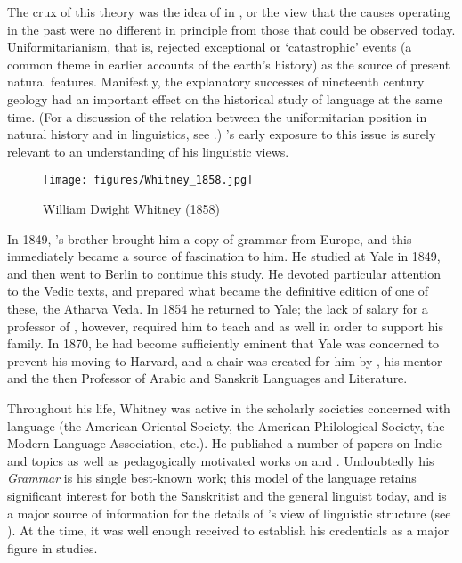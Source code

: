 The crux of this theory was the idea of \emph{} in
, or the view that the causes operating in the past
were no different in principle from those that could be observed
today. Uniformitarianism, that is, rejected exceptional or
`catastrophic' events (a common theme in earlier accounts of the
earth's history) as the source of present natural
features. Manifestly, the explanatory successes of nineteenth century
geology had an important effect on the historical study of language at
the same time. (For a discussion of the relation between the
uniformitarian position in natural history and in linguistics, see
\citealt{christy83:uniformitarianism}.) {\Whitney}'s early exposure to
this issue is surely relevant to an understanding of his linguistic
views.

\begin{wrapfigure}{l}{.4\textwidth}
  \texttt{[image: figures/Whitney\_1858.jpg]}
  \caption{William Dwight Whitney (1858)}
  \label{fig:ch.boas.young_whitney}
\end{wrapfigure}
In 1849, {\Whitney}'s brother brought him a copy of
  grammar from Europe, and this
immediately became a source of fascination to him. He studied 
at Yale in 1849, and then went to Berlin to continue this study. He
devoted particular attention to the Vedic texts, and prepared what
became the definitive edition of one of these, the Atharva Veda. In
1854 he returned to Yale; the lack of salary for a professor of
, however, required him to teach  and  as well in
order to support his family. In 1870, he had become sufficiently
eminent that Yale was concerned to prevent his moving to Harvard, and
a chair was created for him by , his mentor and the
then Professor of {Arabic} and {Sanskrit} Languages and Literature.

Throughout his life, Whitney was active in the scholarly societies
concerned with language (the American Oriental Society, the American
Philological Society, the Modern Language Association, etc.). He
published a number of papers on Indic and  topics as well
as pedagogically motivated works on  and . Undoubtedly his
\textsl{ Grammar} \citep{whitney79:skt.grammar} is his single
best-known work; this model  of the language retains
significant interest for both the Sanskritist and the general linguist
today, and is a major source of information for the details of
{\Whitney}'s view of linguistic structure (see
\citealt{mccawley67:whitney}). At the time, it was well enough
received to establish his credentials as a major figure in
 studies.

